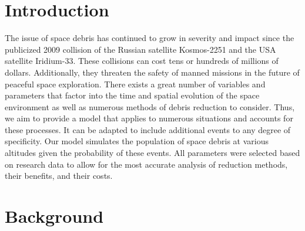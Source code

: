 \documentclass[pre,12pt]{revtex4-1}
\begin{document}
%

\section{Introduction}\label{Introduction}

The issue of space debris has continued to grow in severity and impact since the publicized 2009 collision of the Russian satellite Kosmos-2251 and the USA satellite Iridium-33. These collisions can cost tens or hundreds of millions of dollars. Additionally, they threaten the safety of manned missions in the future of peaceful space exploration. There exists a great number of variables and parameters that factor into the time and spatial evolution of the space environment as well as numerous methods of debris reduction to consider. Thus, we aim to provide a model that applies to numerous situations and accounts for these processes. It can be adapted to include additional events to any degree of specificity. Our model simulates the population of space debris at various altitudes given the probability of these events. All parameters were selected based on research data to allow for the most accurate analysis of reduction methods, their benefits, and their costs.

\section{Background}\label{Background}
\end{document}
